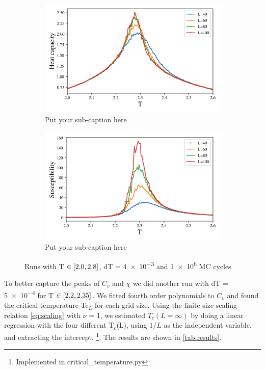 \begin{figure}[ht]
\begin{subfigure}[t]{.5\textwidth}
    \includegraphics[width=\linewidth]{../figures/phase_cv.png}
    \caption{Put your sub-caption here}
    \label{fig:sub-second}
  \end{subfigure}
  \begin{subfigure}[t]{.5\textwidth}
    \centering
    \includegraphics[width=\linewidth]{../figures/phase_suscept.png}
    \caption{Put your sub-caption here}
    \label{fig:sub-second}
  \end{subfigure}
\caption{Runs with T $\in \left[2.0,2.8\right]$, dT = \num{4e-3} and
\num{1e6} MC cycles}
\label{fig:phase}
\end{figure}

To better capture the peaks of $C_v$ and $\chi$ we did another
run with dT = \num{5e-4} for T $\in \left[2.2, 2.35\right]$.
 We fitted fourth order polynomials to $C_v$ and found
the critical temperature Tc$_{L}$ for each grid size.
Using the finite size scaling relation
\cref{eq:scaling} with $\nu$ = 1, we estimated $T_c(L=\infty)$
by doing a linear
regression with the four different T$_c$(L), using $1/L$ as the independent
variable, and extracting the intercept.
\footnote{Implemented in critical\_temperature.py}. The results are shown in
\cref{tab:results}.

